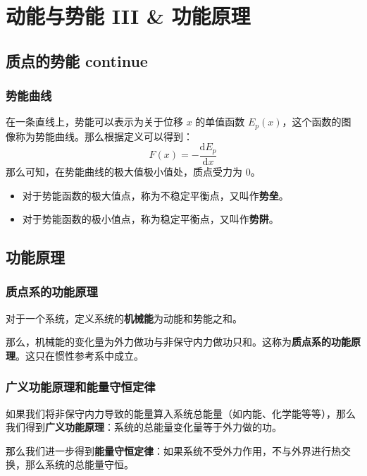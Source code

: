 \section{动能与势能 III \& 功能原理}

\subsection{质点的势能 continue}

\subsubsection{势能曲线}

在一条直线上，势能可以表示为关于位移 $x$ 的单值函数 $E_p(x)$，这个函数的图像称为势能曲线。那么根据定义可以得到：
$$
F(x) = -\frac{\mathrm{d} E_p}{\mathrm{d} x}
$$
那么可知，在势能曲线的极大值极小值处，质点受力为 $0$。

\begin{itemize}
    \item 对于势能函数的极大值点，称为不稳定平衡点，又叫作\textbf{势垒}。
    \item 对于势能函数的极小值点，称为稳定平衡点，又叫作\textbf{势阱}。
\end{itemize}

\subsection{功能原理}

\subsubsection{质点系的功能原理}

\begin{definition}
    对于一个系统，定义系统的\textbf{机械能}为动能和势能之和。
\end{definition}

那么，机械能的变化量为外力做功与非保守内力做功只和。这称为\textbf{质点系的功能原理}。这只在惯性参考系中成立。

\subsubsection{广义功能原理和能量守恒定律}

如果我们将非保守内力导致的能量算入系统总能量（如内能、化学能等等），那么我们得到\textbf{广义功能原理}：系统的总能量变化量等于外力做的功。

那么我们进一步得到\textbf{能量守恒定律}：如果系统不受外力作用，不与外界进行热交换，那么系统的总能量守恒。

